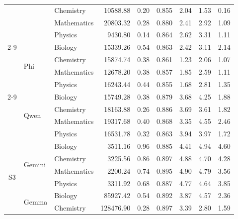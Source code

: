 ﻿\documentclass[a4paper,conference,10pt]{IEEEtran}
\begin{document}
\begin{table}[!t]
\begin{tabular}{|c|l|l|r|r|r|r|r|r|}
  &                         & Chemistry   & 10588.88         & 0.20          & 0.855 & 2.04          & 1.53 & 0.16 \\
  &                         & Mathematics & 20803.32         & 0.28          & 0.880 & 2.41          & 2.92 & 1.09 \\
  &                         & Physics     &  9430.80         & 0.14          & 0.864 & 2.62          & 3.31 & 1.11 \\ \cline{2-9}
  & \multirow{4}{*}{Phi}    & Biology     & 15339.26         & 0.54          & 0.863 & 2.42          & 3.11 & 2.14 \\
  &                         & Chemistry   & 15874.74         & 0.38          & 0.861 & 1.23          & 2.06 & 1.07 \\
  &                         & Mathematics & 12678.20         & 0.38          & 0.857 & 1.85          & 2.59 & 1.11 \\
  &                         & Physics     & 16243.44         & 0.44          & 0.855 & 1.68          & 2.81 & 1.35 \\ \cline{2-9}
  & \multirow{4}{*}{Qwen}   & Biology     & 15749.28         & 0.38          & 0.879 & 3.68          & 4.25 & 1.88 \\
  &                         & Chemistry   & 18163.88         & 0.26          & 0.886 & 3.69          & 3.61 & 1.82 \\
  &                         & Mathematics & 19317.68         & 0.40          & 0.868 & 3.35          & 4.55 & 2.46 \\
  &                         & Physics     & 16531.78         & 0.32          & 0.863 & 3.94          & 3.97 & 1.72 \\
\hline
\multirow{20}{*}{S3}
  & \multirow{4}{*}{Gemini} & Biology     & 3511.16 & 0.96 & 0.885 & 4.41 & 4.94 & 4.60 \\
  &                                   & Chemistry   & 3225.56 & 0.86 & 0.897 & 4.88 & 4.70 & 4.28 \\
  &                                   & Mathematics & 2200.24 & 0.74 & 0.895 & 4.90 & 4.79 & 3.56 \\
  &                                   & Physics     & 3311.92 & 0.68 & 0.887 & 4.77 & 4.64 & 3.85 \\ \cline{2-9}
  & \multirow{4}{*}{Gemma}           & Biology     & 85927.42         & 0.54          & 0.892 & 3.87          & 4.57 & 2.36 \\
  &                                   & Chemistry   &128476.90         & 0.28          & 0.897 & 3.39          & 2.80 & 1.59 \\

\end{tabular}
\end{table}
\end{document}
